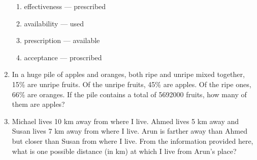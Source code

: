 \documentclass[journal,11pt,onecolumn]{IEEEtran}
\begin{document}
\begin{enumerate}
          \begin{enumerate}

              \item effectiveness --- prescribed

              \item availability --- used

              \item prescription --- available

              \item acceptance --- proscribed

          \end{enumerate}

    \item In a huge pile of apples and oranges, both ripe and unripe mixed together, 15\% are unripe fruits. Of the unripe fruits, 45\% are apples. Of the ripe ones, 66\% are oranges. If the pile contains a total of 5692000 fruits, how many of them are apples?

          \begin{enumerate}


          \end{enumerate}

    \item Michael lives 10 km away from where I live. Ahmed lives 5 km away and Susan lives 7 km away from where I live. Arun is farther away than Ahmed but closer than Susan from where I live. From the information provided here, what is one possible distance (in km) at which I live from Arun's place?

          \begin{enumerate}


          \end{enumerate}

\end{enumerate}
\end{document}
